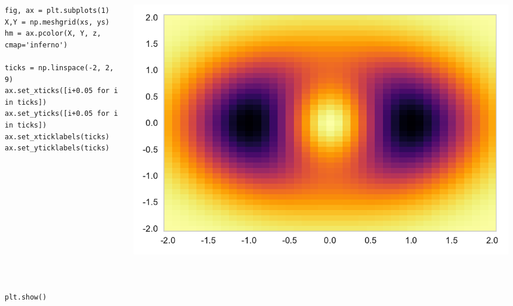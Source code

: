 \documentclass{beamer}
\begin{document}
\begin{frame}[fragile]
\tiny{
\begin{columns}
\begin{column}{0.45\textwidth}
\begin{verbatim}
fig, ax = plt.subplots(1)
X,Y = np.meshgrid(xs, ys)
hm = ax.pcolor(X, Y, z, cmap='inferno')

ticks = np.linspace(-2, 2, 9)
ax.set_xticks([i+0.05 for i in ticks])
ax.set_yticks([i+0.05 for i in ticks])
ax.set_xticklabels(ticks)
ax.set_yticklabels(ticks)












plt.show()
\end{verbatim}
\end{column}
\begin{column}{0.55\textwidth}
\includegraphics[width=\textwidth]{../heatmap_4.pdf}
\end{column}
\end{columns}
}
\end{frame}
\end{document}
